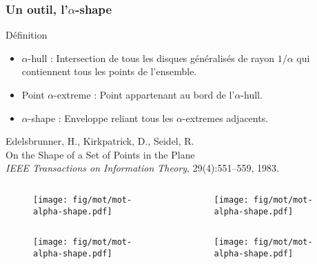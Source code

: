 \begin{frame}
  \frametitle{Un outil, l'$\alpha$-shape}
  \begin{block}{Définition}
    \begin{itemize}
      \item $\alpha$-hull : Intersection de tous les disques généralisés de rayon $1/\alpha$ qui contiennent tous les points de l'ensemble.
      \item Point $\alpha$-extreme : Point appartenant au bord de l'$\alpha$-hull.
      \item $\alpha$-shape : Enveloppe reliant tous les $\alpha$-extremes adjacents.
    \end{itemize}
\begin{tiny}
  [EKS83] Edelsbrunner, H., Kirkpatrick, D., Seidel, R.\\
  On the Shape of a Set of Points in the Plane\\
  {\em IEEE Transactions on Information Theory}, 29(4):551--559, 1983.\\
\end{tiny}   
  \end{block}
  \vspace{-1cm}
  { 
    \begin{columns}[t]
      \begin{column}{5cm}
        \begin{figure}[h!]
          \centering
          \texttt{[image: fig/mot/mot-alpha-shape.pdf]}
         \end{figure}
       \end{column}
       \begin{column}{5cm}
         \begin{figure}[h!]
           \centering
           \texttt{[image: fig/mot/mot-alpha-shape.pdf]}
         \end{figure}
       \end{column}
    \end{columns} 
  }
  { 
    \begin{columns}[t]
      \begin{column}{5cm}
        \begin{figure}[h!]
          \centering
          \texttt{[image: fig/mot/mot-alpha-shape.pdf]}
         \end{figure}
       \end{column}
       \begin{column}{5cm}
         \begin{figure}[h!]
           \centering
           \texttt{[image: fig/mot/mot-alpha-shape.pdf]}
         \end{figure}
       \end{column}
    \end{columns} 
  }
\end{frame}

